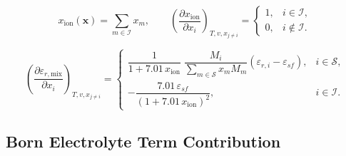 \documentclass[12pt, letterpaper]{article}
\begin{document}

\begin{equation}
    x_{\mathrm{ion}}(\mathbf{x})=\sum_{m\in\mathcal{I}} x_{m},
    \qquad
    \left(\frac{\partial x_{\mathrm{ion}}}{\partial x_{i}}\right)_{T,v,x_{j\neq i}}
    =
    \begin{cases}
        1, & i\in\mathcal{I},    \\
        0, & i\notin\mathcal{I}.
    \end{cases}
    \label{eq:x_ion_total}
\end{equation}


\begin{equation}
    \left(\frac{\partial \varepsilon_{r,\mathrm{mix}}}{\partial x_{i}}\right)_{T,v,x_{j\neq i}}
    =
    \begin{cases}
        \dfrac{1}{1+7.01\,x_{\mathrm{ion}}}\;
        \dfrac{M_{i}}{\displaystyle \sum_{m\in\mathcal{S}} x_{m} M_{m}}
        \left(\varepsilon_{r,i}-\varepsilon_{sf}\right),
         & i\in\mathcal{S}, \\[14pt]
        -\dfrac{7.01\,\varepsilon_{sf}}{\left(1+7.01\,x_{\mathrm{ion}}\right)^{2}},
         & i\in\mathcal{I}.
    \end{cases}
    \label{eq:depsr_mix_dxi_piecewise}
\end{equation}



\subsection{Born Electrolyte Term Contribution}

\end{document}
